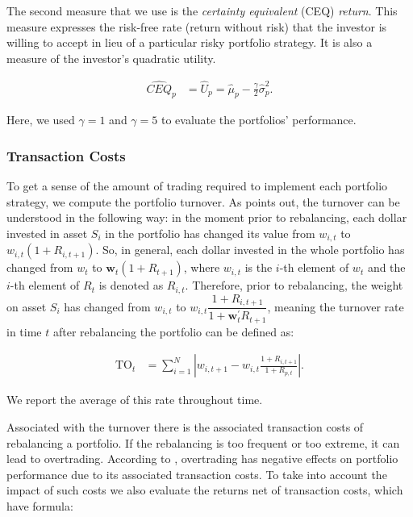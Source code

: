 \documentclass[12pt,oneside,a4paper]{memoir}
\begin{document}
The second measure that we use is the \textit{certainty equivalent} (CEQ) \textit{return}. This measure expresses the risk-free rate (return without risk) that the investor is willing to accept in lieu of a particular risky portfolio strategy. It is also a measure of the investor's quadratic utility.

\vspace{-12pt}
\begin{align} \label{CEQ}
	\hat{CEQ}_{p} &= \hat{U}_p = \hat{\mu}_{p} - \frac{\gamma}{2} \hat{\sigma}^{2}_{p}.
\end{align}

\noindent
Here, we used $\gamma=1$ and $\gamma=5$ to evaluate the portfolios' performance.

\subsubsection*{Transaction Costs}

To get a sense of the amount of trading required to implement each portfolio strategy, we compute the portfolio turnover. As  points out, the turnover can be understood in the following way: in the moment prior to rebalancing, each dollar invested in asset $S_{i}$ in the portfolio has changed its value from $w_{i,t}$ to $w_{i,t}(1+R_{i,t+1})$. So, in general, each dollar invested in the whole portfolio has changed from $w_{t}$ to $\mathbf{w}_{t}(1+R_{t+1})$, where $w_{i,t}$ is the $i$-th element of $w_{t}$ and the $i$-th element of $R_{t}$ is denoted as $R_{i,t}$. Therefore, prior to rebalancing, the weight on asset $S_{i}$ has changed from $w_{i,t}$ to $w_{i,t}\dfrac{1+R_{i,t+1}}{1+\mathbf{w}_{t}^{\prime}R_{t+1}}$, meaning the turnover rate in time $t$ after rebalancing the portfolio can be defined as:

\begin{align}
	\label{to}
	\mathrm{TO}_{t} &= \sum_{i=1}^{N} \left|w_{i, t+1} - w_{i,t}\frac{1+R_{i,t+1}}{1+R_{p,t}}\right|.
\end{align}

\noindent
We report the average of this rate throughout time.

Associated with the turnover there is the associated transaction costs of rebalancing a portfolio.
If the rebalancing is too frequent or too extreme, it can lead to overtrading.
According to , overtrading has negative effects on portfolio performance due to its associated transaction costs.
To take into account the impact of such costs we also evaluate the returns net of transaction costs, which have formula:
\end{document}
